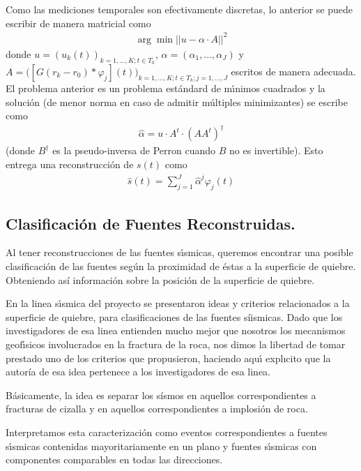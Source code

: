Como las mediciones temporales son efectivamente discretas, lo anterior se puede
escribir de manera matricial como
\begin{align*}
\arg\min || u-\alpha\cdot A||^2
\end{align*}
donde $u=(u_k(t))_{k=1,...,K; t\in T_k}$, $\alpha=(\alpha_1,...,\alpha_J)$ y $A=\Big([G(r_k-r_0)* \varphi_j](t)\Big)_{k=1,...,K; t\in T_k;  j=1,...,J}$ escritos de manera adecuada.
El problema anterior es un problema est\'andard de m\'{\i}nimos cuadrados y la soluci\'on (de menor norma en
caso de admitir m\'ultiples minimizantes) se escribe como
\begin{align*}
\hat{\alpha}=u\cdot A^t\cdot (AA^t)^\dagger
\end{align*}
(donde $B^\dagger$ es la pseudo-inversa de Perron cuando $B$ no es invertible). Esto entrega una
reconstrucci\'on de $s(t)$ como
\begin{align*}
\hat{s}(t)=\sum_{j=1}^J \hat{\alpha}^j \varphi_j(t)
\end{align*}

\subsection{Clasificaci\'on de Fuentes Reconstruidas.}

Al tener reconstrucciones de las fuentes s\'{\i}smicas, queremos encontrar
una posible clasificaci\'on de las fuentes seg\'un la
proximidad de \'estas a la superficie de quiebre. Obteniendo as\'i informaci\'on
sobre la posici\'on de la superficie de quiebre.

En la linea s\'{\i}smica del proyecto se presentaron ideas y criterios relacionados
a la superficie de quiebre, para clasificaciones de las fuentes s\'{i}ismicas. Dado
que los investigadores de esa linea entienden mucho mejor que nosotros los
mecanismos geof\'{\i}sicos involucrados en la fractura de la roca, nos dimos la
libertad de tomar prestado uno de los criterios que propusieron, haciendo aqu\'{\i}
expl{\i}cito que la autor\'{i}a de esa idea pertenece a los investigadores de
esa linea. 

B\'asicamente, la idea es separar los s\'{i}smos en aquellos correspondientes
a fracturas de cizalla y en aquellos correspondientes a implosi\'on de roca.

Interpretamos esta caracterizaci\'on como eventos correspondientes a fuentes s\'{\i}smicas
contenidas mayoritariamente en un plano y fuentes s\'{\i}smicas con
componentes comparables en todas las direcciones.

